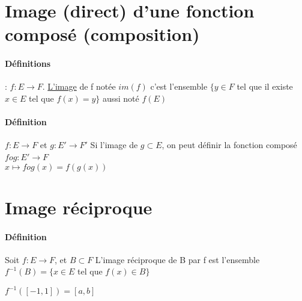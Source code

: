 \section{Image (direct) d'une fonction composé (composition)}
\paragraph{Définitions} : $f:E \rightarrow F$. \ul{L'image} de f notée $im(f)$ c'est l'ensemble $\{y \in F$ tel que il existe $x \in E$ tel que $f(x) = y\}$ aussi noté $f(E)$

\paragraph{Définition} $f:E \rightarrow F$ et $g:E' \rightarrow F'$
Si l'image de $g \subset E$, on peut définir la fonction composé $f o g : E' \rightarrow F$ 
~\\
$x \mapsto f o g (x) = f(g(x))$

\section{Image réciproque} 
\paragraph{Définition} Soit $f:E \rightarrow F$, et $B \subset F$ L'image réciproque de B par f est l'ensemble  $f^{-1}(B) = \{x \in E$ tel que $f(x) \in B\}$

$f^{-1}([-1, 1]) = [a, b]$
